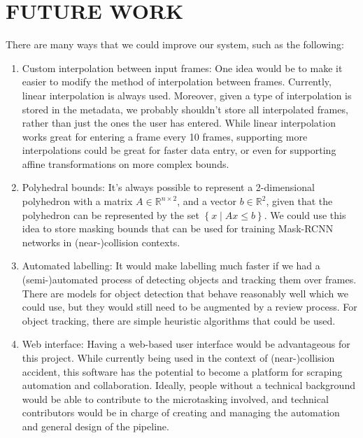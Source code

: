 \documentclass[letterpaper, 10 pt, conference]{IEEEconf}
\newcommand{\todo}[1]{{\color{red}#1}}
\begin{document}

\section{FUTURE WORK}

There are many ways that we could improve our system, such as the following:
\begin{enumerate}
\item Custom interpolation between input frames: One idea would be to make it easier to modify the method of interpolation between frames. Currently, linear interpolation is always used. Moreover, given a type of interpolation is stored in the metadata, we probably shouldn't store all interpolated frames, rather than just the ones the user has entered. While linear interpolation works great for entering a frame every 10 frames, supporting more interpolations could be great for faster data entry, or even for supporting affine transformations on more complex bounds.

\item Polyhedral bounds: It's always possible to represent a 2-dimensional polyhedron with a matrix $A\in\mathbb{R}^{n\times 2}$, and a vector $b\in\mathbb{R}^2$, given that the polyhedron can be represented by the set $\left\{x\mid Ax\leq b\right\}$. We could use this idea to store masking bounds that can be used for training Mask-RCNN networks in (near-)collision contexts. 

\item Automated labelling: It would make labelling much faster if we had a (semi-)automated process of detecting objects and tracking them over frames. There are models for object detection that behave reasonably well which we could use, but they would still need to be augmented by a review process. For object tracking, there are simple heuristic algorithms that could be used. 

\item Web interface: Having a web-based user interface would be advantageous for this project. While currently being used in the context of (near-)collision accident, this software has the potential to become a platform for scraping automation and collaboration. Ideally, people without a technical background would be able to contribute to the microtasking involved, and technical contributors would be in charge of creating and managing the automation and general design of the pipeline.

\end{enumerate}

\addtolength{\textheight}{-12cm}



\nocite{*}
\printbibliography
\end{document}

